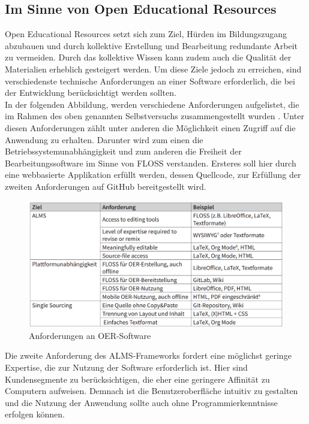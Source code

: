 \subsection{Im Sinne von Open Educational Resources}
Open Educational Resources setzt sich zum Ziel, Hürden im Bildungszugang abzubauen und durch kollektive Erstellung und Bearbeitung redundante Arbeit zu vermeiden. Durch das kollektive Wissen kann zudem auch die Qualität der Materialien erheblich gesteigert werden. Um diese Ziele jedoch zu erreichen, sind verschiedenste technische Anforderungen an einer Software erforderlich, die bei der Entwicklung berücksichtigt werden sollten. \\

In der folgenden Abbildung, werden verschiedene Anforderungen aufgelistet, die im Rahmen des oben genannten Selbstversuchs zusammengestellt wurden \cite{Lechtenborger.2019}. Unter diesen Anforderungen zählt unter anderen die Möglichkeit einen Zugriff auf die Anwendung zu erhalten. Darunter wird zum einen die Betriebssystemunabhängigkeit und zum anderen die Freiheit der Bearbeitungssoftware im Sinne von FLOSS verstanden. Ersteres soll hier durch eine webbasierte Applikation erfüllt werden, dessen Quellcode, zur Erfüllung der zweiten Anforderungen auf GitHub bereitgestellt wird. 

\begin{figure}[h]
\begin{center}
\includegraphics[width = 16cm]{alms_framework.png}
\caption{Anforderungen an OER-Software \cite{Lechtenborger.2019}}
\label{Anforderungen an OER-Software}

\end{center}
\end{figure}


Die zweite Anforderung des ALMS-Frameworks fordert eine möglichst geringe Expertise, die zur Nutzung der Software erforderlich ist. Hier sind Kundensegmente zu berücksichtigen, die eher eine geringere Affinität zu Computern aufweisen. Demnach ist die Benutzeroberfläche intuitiv zu gestalten und die Nutzung der Anwendung sollte auch ohne Programmierkenntnisse erfolgen können.

